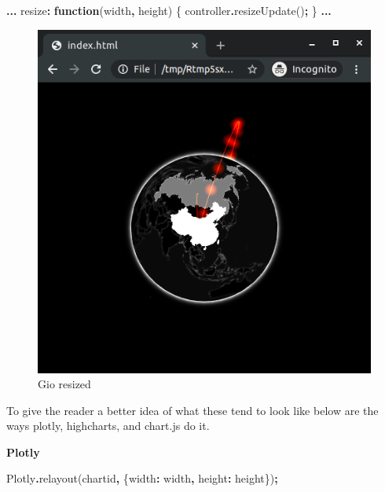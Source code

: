 \documentclass[
]{krantz}
\makeatletter
\newenvironment{Shaded}{\begin{snugshade}}{\end{snugshade}}
\newcommand{\DataTypeTok}[1]{\textcolor[rgb]{0.27,0.27,0.27}{#1}}
\newcommand{\FunctionTok}[1]{\textcolor[rgb]{0,0,0}{#1}}
\newcommand{\KeywordTok}[1]{\textcolor[rgb]{0.27,0.27,0.27}{\textbf{#1}}}
\newcommand{\NormalTok}[1]{#1}
\newcommand{\OperatorTok}[1]{\textcolor[rgb]{0.43,0.43,0.43}{\textbf{#1}}}
\newcommand{\StringTok}[1]{\textcolor[rgb]{0.5,0.5,0.5}{#1}}
\newenvironment{kframe}{%
\medskip{}
\setlength{\fboxsep}{.8em}
 \def\at@end@of@kframe{}%
 \ifinner\ifhmode%
  \def\at@end@of@kframe{\end{minipage}}%
  \begin{minipage}{\columnwidth}%
 \fi\fi%
 \def\FrameCommand##1{\hskip\@totalleftmargin \hskip-\fboxsep
 \colorbox{shadecolor}{##1}\hskip-\fboxsep
     \hskip-\linewidth \hskip-\@totalleftmargin \hskip\columnwidth}%
 \MakeFramed {\advance\hsize-\width
   \@totalleftmargin\z@ \linewidth\hsize
   \@setminipage}}%
 {\par\unskip\endMakeFramed%
 \at@end@of@kframe}
\renewenvironment{Shaded}{\begin{kframe}}{\end{kframe}}
\makeatother
\begin{document}
\begin{Shaded}
\begin{Highlighting}[]
\OperatorTok{...}
\NormalTok{resize}\OperatorTok{:} \KeywordTok{function}\NormalTok{(width}\OperatorTok{,}\NormalTok{ height) \{}
\NormalTok{  controller}\OperatorTok{.}\FunctionTok{resizeUpdate}\NormalTok{()}\OperatorTok{;}
\NormalTok{\}}
\OperatorTok{...}
\end{Highlighting}
\end{Shaded}

\begin{figure}
\centering
\includegraphics{images/gio-small.png}
\caption{Gio resized}
\end{figure}

To give the reader a better idea of what these tend to look like below are the ways plotly, highcharts, and chart.js do it.

\textbf{Plotly}

\begin{Shaded}
\begin{Highlighting}[]
\NormalTok{Plotly}\OperatorTok{.}\FunctionTok{relayout}\NormalTok{(}\StringTok{\textquotesingle{}chartid\textquotesingle{}}\OperatorTok{,}\NormalTok{ \{}\DataTypeTok{width}\OperatorTok{:}\NormalTok{ width}\OperatorTok{,} \DataTypeTok{height}\OperatorTok{:}\NormalTok{ height\})}\OperatorTok{;}
\end{Highlighting}
\end{Shaded}
\end{document}
